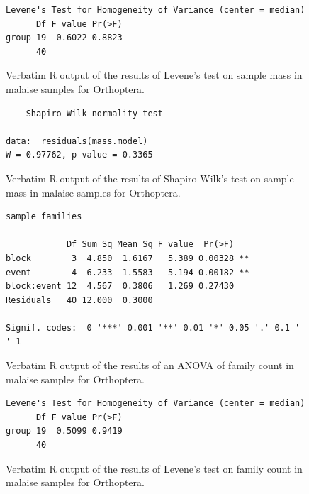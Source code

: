\documentclass[10pt,letterpaper,twocolumn]{article}
\begin{document}
\begin{figure}[h]
	\lstset{numbers=left}
	\lstset{xleftmargin=5mm,framexleftmargin=5mm}
	\begin{lstlisting}
Levene's Test for Homogeneity of Variance (center = median)
      Df F value Pr(>F)
group 19  0.6022 0.8823
      40               
	\end{lstlisting}
	\caption{Verbatim R output of the results of Levene's test on sample mass in malaise samples for Orthoptera.}
	\label{fig:malaise_orthoptera_mass_levene}
	\smallskip
	\nointerlineskip
	\hrulefill
\end{figure}

\begin{figure}[h]
	\lstset{numbers=left}
	\lstset{xleftmargin=5mm,framexleftmargin=5mm}
	\begin{lstlisting}
	Shapiro-Wilk normality test

data:  residuals(mass.model)
W = 0.97762, p-value = 0.3365
	\end{lstlisting}
	\caption{Verbatim R output of the results of Shapiro-Wilk's test on sample mass in malaise samples for Orthoptera.}
	\label{fig:malaise_orthoptera_mass_shapiro}
	\smallskip
	\nointerlineskip
	\hrulefill
\end{figure}

\begin{figure}[h]
	\lstset{numbers=left}
	\lstset{xleftmargin=5mm,framexleftmargin=5mm}
	\begin{lstlisting}
sample families 

            Df Sum Sq Mean Sq F value  Pr(>F)   
block        3  4.850  1.6167   5.389 0.00328 **
event        4  6.233  1.5583   5.194 0.00182 **
block:event 12  4.567  0.3806   1.269 0.27430   
Residuals   40 12.000  0.3000                   
---
Signif. codes:  0 '***' 0.001 '**' 0.01 '*' 0.05 '.' 0.1 ' ' 1
	\end{lstlisting}
	\caption{Verbatim R output of the results of an ANOVA of family count in malaise samples for Orthoptera.}
	\label{fig:malaise_orthoptera_family_anova}
	\smallskip
	\nointerlineskip
	\hrulefill
\end{figure}

\begin{figure}[h]
	\lstset{numbers=left}
	\lstset{xleftmargin=5mm,framexleftmargin=5mm}
	\begin{lstlisting}
Levene's Test for Homogeneity of Variance (center = median)
      Df F value Pr(>F)
group 19  0.5099 0.9419
      40               
	\end{lstlisting}
	\caption{Verbatim R output of the results of Levene's test on family count in malaise samples for Orthoptera.}
	\label{fig:malaise_orthoptera_family_levene}
	\smallskip
	\nointerlineskip
	\hrulefill
\end{figure}
\end{document}
